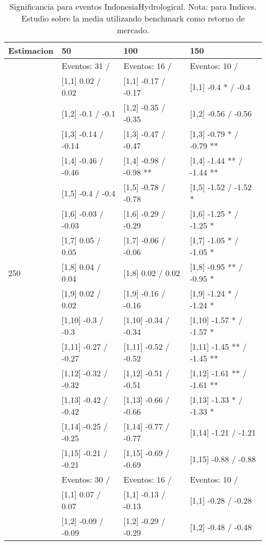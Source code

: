 \begin{table}

\caption{Significancia para eventos IndonesiaHydrological. Nota: para Indices. Estudio sobre la media utilizando benchmark como retorno de mercado.}
\centering
\begin{tabular}[t]{llll}
\toprule
Estimacion & 50 & 100 & 150\\
\midrule
 & Eventos:  31 / & Eventos:  16 / & Eventos:  10 /\\
 & {}[1,1] 0.02  / 0.02 & {}[1,1] -0.17  / -0.17 & {}[1,1] -0.4 * / -0.4\\
 & {}[1,2] -0.1  / -0.1 & {}[1,2] -0.35  / -0.35 & {}[1,2] -0.56  / -0.56\\
 & {}[1,3] -0.14  / -0.14 & {}[1,3] -0.47  / -0.47 & {}[1,3] -0.79 * / -0.79 **\\
 & {}[1,4] -0.46  / -0.46 & {}[1,4] -0.98  / -0.98 ** & {}[1,4] -1.44 ** / -1.44 **\\
\addlinespace
 & {}[1,5] -0.4  / -0.4 & {}[1,5] -0.78  / -0.78 & {}[1,5] -1.52  / -1.52 *\\
 & {}[1,6] -0.03  / -0.03 & {}[1,6] -0.29  / -0.29 & {}[1,6] -1.25 * / -1.25 *\\
 & {}[1,7] 0.05  / 0.05 & {}[1,7] -0.06  / -0.06 & {}[1,7] -1.05 * / -1.05 *\\
250 & {}[1,8] 0.04  / 0.04 & {}[1,8] 0.02  / 0.02 & {}[1,8] -0.95 ** / -0.95 *\\
 & {}[1,9] 0.02  / 0.02 & {}[1,9] -0.16  / -0.16 & {}[1,9] -1.24 * / -1.24 *\\
\addlinespace
 & {}[1,10] -0.3  / -0.3 & {}[1,10] -0.34  / -0.34 & {}[1,10] -1.57 * / -1.57 *\\
 & {}[1,11] -0.27  / -0.27 & {}[1,11] -0.52  / -0.52 & {}[1,11] -1.45 ** / -1.45 **\\
 & {}[1,12] -0.32  / -0.32 & {}[1,12] -0.51  / -0.51 & {}[1,12] -1.61 ** / -1.61 **\\
 & {}[1,13] -0.42  / -0.42 & {}[1,13] -0.66  / -0.66 & {}[1,13] -1.33 * / -1.33 *\\
 & {}[1,14] -0.25  / -0.25 & {}[1,14] -0.77  / -0.77 & {}[1,14] -1.21  / -1.21\\
\addlinespace
 & {}[1,15] -0.21  / -0.21 & {}[1,15] -0.69  / -0.69 & {}[1,15] -0.88  / -0.88\\
 & Eventos:  30 / & Eventos:  16 / & Eventos:  10 /\\
 & {}[1,1] 0.07  / 0.07 & {}[1,1] -0.13  / -0.13 & {}[1,1] -0.28  / -0.28\\
 & {}[1,2] -0.09  / -0.09 & {}[1,2] -0.29  / -0.29 & {}[1,2] -0.48  / -0.48\\

\end{tabular}
\end{table}
